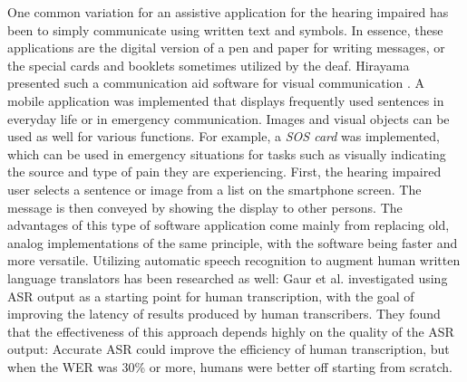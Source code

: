 \documentclass[english, 12pt, a4paper, pdftex, elec, utf8]{aaltothesis}
\begin{document}
One common variation for an assistive application for the hearing impaired has been to simply communicate using written text and symbols. In essence, these applications are the digital version of a pen and paper for writing messages, or the special cards and booklets sometimes utilized by the deaf. Hirayama presented such a communication aid software for visual communication \cite{hirayama2011communication}. A mobile application was implemented that displays frequently used sentences in everyday life or in emergency communication. Images and visual objects can be used as well for various functions. For example, a \textit{SOS card} was implemented, which can be used in emergency situations for tasks such as visually indicating the source and type of pain they are experiencing. First, the hearing impaired user selects a sentence or image from a list on the smartphone screen. The message is then conveyed by showing the display to other persons. The advantages of this type of software application come mainly from replacing old, analog implementations of the same principle, with the software being faster and more versatile. Utilizing automatic speech recognition to augment human written language translators has been researched as well: Gaur et al. \cite{gaur2016effects} investigated using ASR output as a starting point for human transcription, with the goal of improving the latency of results produced by human transcribers. They found that the effectiveness of this approach depends highly on the quality of the ASR output: Accurate ASR could improve the efficiency of human transcription, but when the WER was 30\% or more, humans were better off starting from scratch. \\\\
\end{document}
